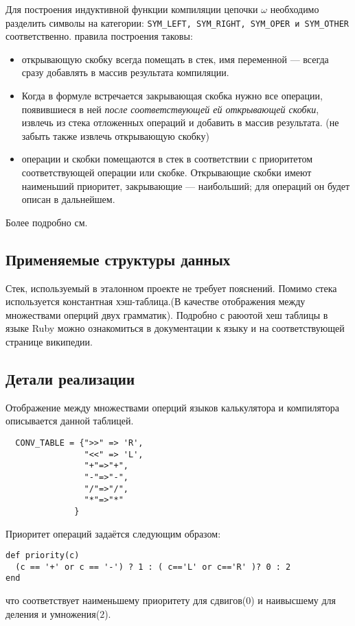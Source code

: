 Для построения индуктивной функции компиляции цепочки $\omega$ необходимо разделить
символы на категории: \verb|SYM_LEFT, SYM_RIGHT, SYM_OPER и SYM_OTHER| соответственно.
правила построения таковы:
\begin{itemize}
  \item открывающую скобку всегда помещать в стек, имя переменной --- всегда
  сразу добавлять в массив результата компиляции.
  \item Когда в формуле встречается закрывающая скобка нужно все операции,
  появившиеся в ней \emph{после соответствующей ей открывающей скобки}, извлечь
  из стека отложенных операций и добавить в массив результата.
  (не забыть также извлечь открывающую скобку)
  \item операции и скобки помещаются в стек в соответствии с приоритетом
  соответствующей операции или скобке. Открывающие скобки имеют наименьший приоритет,
  закрывающие --- наибольший; для операций он будет описан в дальнейшем.
\end{itemize}
Более подробно см. \cite{compf}

\subsection{Применяемые структуры данных}
Стек, используемый в эталонном проекте не требует пояснений.
Помимо стека используется константная хэш-таблица.(В качестве отображения
между множествами оперций двух грамматик). Подробно с раюотой хеш таблицы в языке
Ruby можно ознакомиться в документации к языку \cite{rubydoc} и на соответствующей
странице википедии.

\subsection{Детали реализации}

Отображение между множествами оперций языков калькулятора и компилятора описывается
данной таблицей.
\begin{lstlisting}
  CONV_TABLE = {">>" => 'R',
                "<<" => 'L',
                "+"=>"+",
                "-"=>"-",
                "/"=>"/",
                "*"=>"*"
              }
\end{lstlisting}

Приоритет операций задаётся следующим образом:
\begin{lstlisting}
def priority(c)
  (c == '+' or c == '-') ? 1 : ( c=='L' or c=='R' )? 0 : 2
end
\end{lstlisting}
что соответствует наименьшему приоритету для сдвигов($0$) и наивысшему для
деления и умножения($2$).

